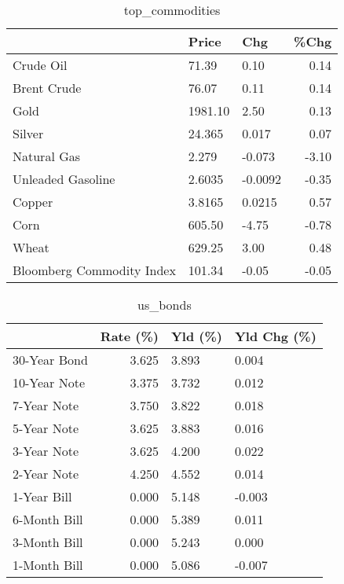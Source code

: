 \documentclass{article}%
\begin{document}
\begin{table}[htbp]%
\caption{top\_commodities}%
\centering%
\begin{adjustbox}{width=1\textwidth}%
\begin{tabular}{lllr}
\toprule
                          &   Price &     Chg &  \%Chg \\
\midrule
               Crude Oil  &   71.39 &    0.10 &  0.14 \\
             Brent Crude  &   76.07 &    0.11 &  0.14 \\
                    Gold  & 1981.10 &    2.50 &  0.13 \\
                  Silver  &  24.365 &   0.017 &  0.07 \\
             Natural Gas  &   2.279 &  -0.073 & -3.10 \\
       Unleaded Gasoline  &  2.6035 & -0.0092 & -0.35 \\
                  Copper  &  3.8165 &  0.0215 &  0.57 \\
                    Corn  &  605.50 &   -4.75 & -0.78 \\
                   Wheat  &  629.25 &    3.00 &  0.48 \\
Bloomberg Commodity Index &  101.34 &   -0.05 & -0.05 \\
\bottomrule
\end{tabular}
%
\end{adjustbox}%
\end{table}

%


\begin{table}[htbp]%
\caption{us\_bonds}%
\centering%
\begin{adjustbox}{width=1\textwidth}%
\begin{tabular}{lrll}
\toprule
             &  Rate (\%) & Yld (\%) & Yld Chg (\%) \\
\midrule
30-Year Bond &     3.625 &   3.893 &       0.004 \\
10-Year Note &     3.375 &   3.732 &       0.012 \\
 7-Year Note &     3.750 &   3.822 &       0.018 \\
 5-Year Note &     3.625 &   3.883 &       0.016 \\
 3-Year Note &     3.625 &   4.200 &       0.022 \\
 2-Year Note &     4.250 &   4.552 &       0.014 \\
 1-Year Bill &     0.000 &   5.148 &      -0.003 \\
6-Month Bill &     0.000 &   5.389 &       0.011 \\
3-Month Bill &     0.000 &   5.243 &       0.000 \\
1-Month Bill &     0.000 &   5.086 &      -0.007 \\
\bottomrule
\end{tabular}
%
\end{adjustbox}%
\end{table}
\end{document}
